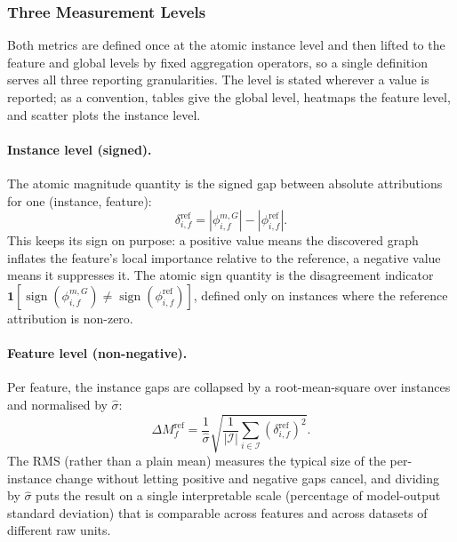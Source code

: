 \documentclass[12pt,a4paper,oneside]{article}
\begin{document}
\subsubsection{Three Measurement Levels}

Both metrics are defined once at the atomic instance level and then lifted to the feature and global levels by fixed aggregation operators, so a single definition serves all three reporting granularities. The level is stated wherever a value is reported; as a convention, tables give the global level, heatmaps the feature level, and scatter plots the instance level.

\paragraph{Instance level (signed).}
The atomic magnitude quantity is the signed gap between absolute attributions for one (instance, feature):
\begin{equation}
  \delta^{\mathrm{ref}}_{i,f} = \left|\phi^{m,G}_{i,f}\right| - \left|\phi^{\mathrm{ref}}_{i,f}\right|.
\end{equation}
This keeps its sign on purpose: a positive value means the discovered graph inflates the feature's local importance relative to the reference, a negative value means it suppresses it. The atomic sign quantity is the disagreement indicator $\mathbf{1}\!\left[\operatorname{sign}(\phi^{m,G}_{i,f}) \neq \operatorname{sign}(\phi^{\mathrm{ref}}_{i,f})\right]$, defined only on instances where the reference attribution is non-zero.

\paragraph{Feature level (non-negative).}
Per feature, the instance gaps are collapsed by a root-mean-square over instances and normalised by $\hat{\sigma}$:
\begin{equation}
  \Delta M^{\mathrm{ref}}_f = \frac{1}{\hat{\sigma}}\sqrt{\frac{1}{|\mathcal{I}|}\sum_{i \in \mathcal{I}} \left(\delta^{\mathrm{ref}}_{i,f}\right)^2}.
\end{equation}
The RMS (rather than a plain mean) measures the typical size of the per-instance change without letting positive and negative gaps cancel, and dividing by $\hat{\sigma}$ puts the result on a single interpretable scale (percentage of model-output standard deviation) that is comparable across features and across datasets of different raw units.
\end{document}

